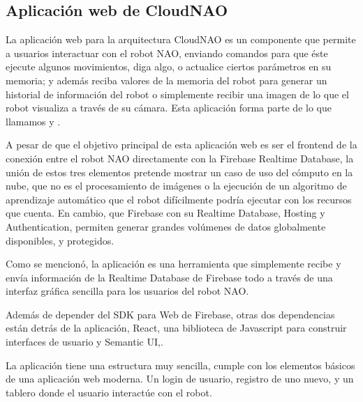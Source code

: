 
\subsection{Aplicación web de CloudNAO}
\label{\detokenize{nao_web:introduccion}}
La aplicación web para la arquitectura CloudNAO es un componente que permite a
usuarios interactuar con el robot NAO, enviando comandos para que éste ejecute
algunos movimientos, diga algo, o actualice ciertos parámetros en su memoria;
y además reciba valores de la memoria del robot para generar un historial
de información del robot o simplemente recibir una imagen de lo que el robot
visualiza a través de su cámara. Esta aplicación forma parte de lo que
llamamos  y .

A pesar de que el objetivo principal de esta aplicación web es ser el
frontend de la conexión entre el robot NAO directamente con la Firebase
Realtime Database, la unión de estos tres elementos pretende
mostrar un caso de uso del cómputo en la nube, que no es el procesamiento de
imágenes o la ejecución de un algoritmo de aprendizaje automático que el robot
difícilmente podría ejecutar con los recursos que cuenta. En cambio,
que Firebase con su Realtime Database, Hosting y Authentication, permiten
generar grandes volúmenes de datos globalmente disponibles, y protegidos.

Como se mencionó, la aplicación es una herramienta que simplemente recibe y envía información de la Realtime Database de
Firebase todo a través de una interfaz gráfica sencilla para los usuarios
del robot NAO.

Además de depender del SDK para Web de Firebase, otras dos dependencias están
detrás de la aplicación, React, una biblioteca de Javascript para construir
interfaces de usuario y Semantic UI,.

La aplicación tiene una estructura muy sencilla, cumple con los elementos
básicos de una aplicación web moderna. Un login de usuario, registro de uno
nuevo, y un tablero donde el usuario interactúe con el robot.



